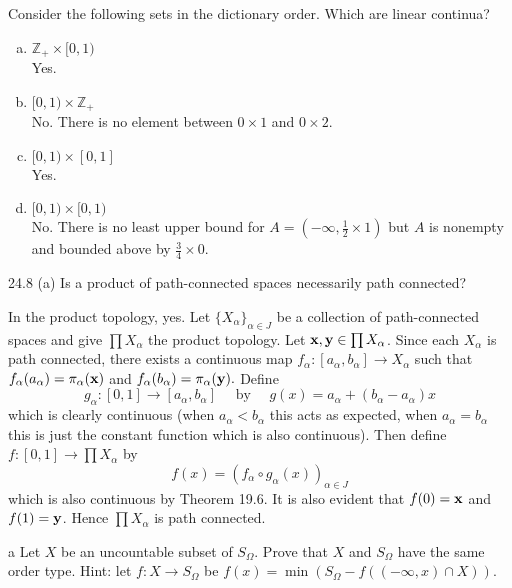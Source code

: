 \documentclass[11pt]{article}
\begin{document}
\begin{ex}{24.5}
  Consider the following sets in the dictionary order. Which are linear
  continua?
  \begin{enumerate}[(a)]
    \item $\mathbb{Z}_+ \times [0, 1)$ \\ Yes.
    \item $[0, 1) \times \mathbb{Z}_+$ \\ No. There is no element between $0
      \times 1$ and $0 \times 2$.
    \item $[0, 1) \times [0, 1]$ \\ Yes.
    \item $[0, 1) \times [0, 1)$ \\ No. There is no least upper bound for
      $A = (-\infty, \frac{1}{2} \times 1)$ but $A$ is nonempty and bounded
      above by $\frac{3}{4} \times 0$.
  \end{enumerate}
\end{ex}

\begin{ex}{24.8 (a)}
  Is a product of path-connected spaces necessarily path connected?
\end{ex}

\begin{solution}
  In the product topology, yes. Let $\{X_\alpha\}_{\alpha \in J}$ be a
  collection of path-connected spaces and give $\prod X_\alpha$ the product
  topology. Let $\vb x, \vb y \in \prod X_\alpha$. Since each $X_\alpha$ is
  path connected, there exists a continuous map $f_\alpha: [a_\alpha, b_\alpha]
  \to X_\alpha$ such that $f_\alpha(a_\alpha) = \pi_\alpha(\vb x)$ and
  $f_\alpha(b_\alpha) = \pi_\alpha(\vb y).$ Define
  \[ g_\alpha : [0, 1] \to [a_\alpha, b_\alpha] \quad\text{ by }\quad g(x) =
    a_\alpha + (b_\alpha - a_\alpha)x \]
  which is clearly continuous (when $a_\alpha < b_\alpha$ this acts as
  expected, when $a_\alpha = b_\alpha$ this is just the constant function which
  is also continuous). Then define $f : [0, 1] \to \prod X_\alpha$ by
  \[ f(x) = (f_\alpha \circ g_\alpha (x))_{\alpha \in J} \]
  which is also continuous by Theorem 19.6. It is also evident that $f(0) = \vb
  x$ and $f(1) = \vb y$. Hence $\prod X_\alpha$ is path connected.
\end{solution}


\begin{p}{a}
  Let $X$ be an uncountable subset of $S_\Omega$. Prove that $X$ and $S_\Omega$
  have the same order type. Hint: let $f : X \to S_\Omega$ be $f(x) =
  \min(S_\Omega - f((-\infty, x) \cap X)).$
\end{p}
\end{document}

